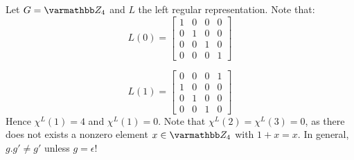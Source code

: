 \begin{example}
	Let $G = \bfZ_4$ and $L$ the left regular representation. Note that:
	\[
		L(0) = 
\begin{bmatrix}
1 & 0 & 0 & 0 \\
0 & 1 & 0 & 0 \\
0 & 0 & 1 & 0 \\
0 & 0 & 0 & 1
\end{bmatrix}
	\] 

	\[
		L(1) = 
		\begin{bmatrix}
0 & 0 & 0 & 1 \\
1 & 0 & 0 & 0 \\
0 & 1 & 0 & 0 \\
0 & 0 & 1 & 0
\end{bmatrix}
	\] 
	Hence $\chi^{L}(1) = 4$ and $\chi^{L}(1) = 0$. Note that $\chi^{L}(2) = \chi^{L}(3) = 0$, as there does not exists a nonzero element $x \in \bfZ_4$ with $1 + x = x$. In general, $g.g' \neq g'$ unless $g = \epsilon$!
\end{example}

